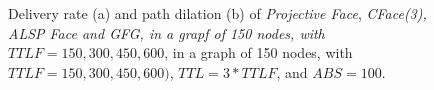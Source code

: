 \documentclass[journal,comsoc]{IEEEtran}
\begin{document}
\begin{figure}


\caption{Delivery rate (a) and path dilation (b) of \emph{Projective Face}, \emph{CFace(3), \emph{ALSP Face} and \emph{GFG}, in a grapf of 150 nodes, with \(TTLF = 150, 300, 450, 600\)}, in a graph of 150 nodes, with \(TTLF = 150, 300, 450, 600)\), \(TTL = 3 * TTLF\), and \(ABS = 100\).}
\label{fig:change_TTLF}
\end{figure}
\end{document}
